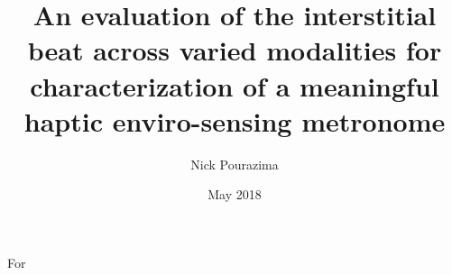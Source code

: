 \documentclass[12pt]{cmuthesis}
\begin{document}
 
\frontmatter

\pagestyle{empty}

\title{ %
{\bf An evaluation of the interstitial beat across varied modalities for characterization of a meaningful haptic enviro-sensing metronome}}
\author{Nick Pourazima}
\date{May 2018}
\trnumber{}


\support{}
\disclaimer{}



\maketitle

\begin{dedication}
For
\end{dedication}

\pagestyle{plain} %

\end{document}
